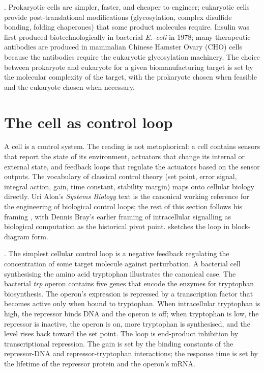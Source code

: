 . Prokaryotic cells are simpler,
faster, and cheaper to engineer; eukaryotic cells provide
post-translational modifications (glycosylation, complex disulfide
bonding, folding chaperones) that some product molecules require.
Insulin was first produced biotechnologically in bacterial
\emph{E.~coli} in 1978; many therapeutic antibodies are produced in
mammalian Chinese Hamster Ovary (CHO) cells because the antibodies
require the eukaryotic glycosylation machinery. The choice between
prokaryote and eukaryote for a given biomanufacturing target is set
by the molecular complexity of the target, with the prokaryote chosen
when feasible and the eukaryote chosen when necessary.

\section{The cell as control loop}

A cell is a control system. The reading is not metaphorical: a cell
contains sensors that report the state of its environment, actuators
that change its internal or external state, and feedback loops that
regulate the actuators based on the sensor outputs. The vocabulary of
classical control theory (set point, error signal, integral action,
gain, time constant, stability margin) maps onto cellular biology
directly. Uri Alon's \emph{Systems Biology} text is the canonical
working reference for the engineering of biological control loops;
the rest of this section follows his framing
\cite[ch.~2--5]{text:alon-systems-biology}, with Dennis Bray's earlier
framing of intracellular signalling as biological computation
\cite{paper:v6c01-bray-1995} as the historical pivot point.
 sketches the loop in
block-diagram form.



. The simplest cellular control loop is a
negative feedback regulating the concentration of some target
molecule against perturbation. A bacterial cell synthesising the amino
acid tryptophan illustrates the canonical case. The bacterial
\emph{trp} operon contains five genes that encode the enzymes for
tryptophan biosynthesis. The operon's expression is repressed by a
transcription factor that becomes active only when bound to
tryptophan. When intracellular tryptophan is high, the repressor binds
DNA and the operon is off; when tryptophan is low, the repressor is
inactive, the operon is on, more tryptophan is synthesised, and the
level rises back toward the set point. The loop is end-product
inhibition by transcriptional repression. The gain is set by the
binding constants of the repressor-DNA and repressor-tryptophan
interactions; the response time is set by the lifetime of the
repressor protein and the operon's mRNA.

